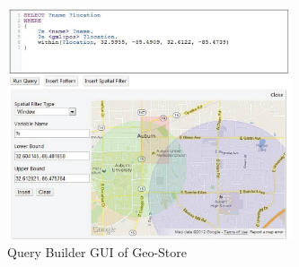 \begin{figure}[t]
\centering
\includegraphics[width=3.3in]{images/geostore_web.eps}
\caption{Query Builder GUI of Geo-Store}\label{fig:geostore_web}
\end{figure}
